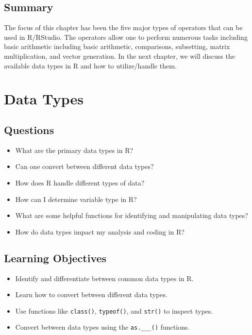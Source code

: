 \documentclass[
  letterpaper,
  DIV=11,
  numbers=noendperiod]{scrreprt}
\begin{document}
\section{Summary}\label{summary-6}

The focus of this chapter has been the five major types of operators
that can be used in R/RStudio. The operators allow one to perform
numerous tasks including basic arithmetic including basic arithmetic,
comparisons, subsetting, matrix multiplication, and vector generation.
In the next chapter, we will discuss the available data types in R and
how to utilize/handle them.


\chapter{Data Types}\label{sec-data-types}

\section{Questions}\label{questions-7}

\begin{itemize}
\item
  What are the primary data types in R?
\item
  Can one convert between different data types?
\item
  How does R handle different types of data?
\item
  How can I determine variable type in R?
\item
  What are some helpful functions for identifying and manipulating data
  types?
\item
  How do data types impact my analysis and coding in R?
\end{itemize}

\section{Learning Objectives}\label{learning-objectives-7}

\begin{itemize}
\item
  Identify and differentiate between common data types in R.
\item
  Learn how to convert between different data types.
\item
  Use functions like \texttt{class()}, \texttt{typeof()}, and
  \texttt{str()} to inspect types.
\item
  Convert between data types using the \texttt{as.\_\_\_()} functions.
\end{itemize}
\end{document}
